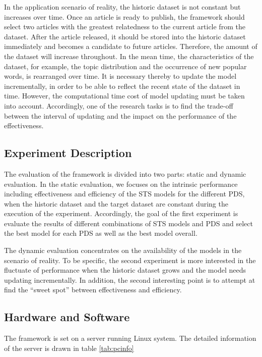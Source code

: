 In the application scenario of reality, the historic dataset is not constant but increases over time. Once an article is ready to publish, the framework should select two articles with the greatest relatedness to the current article from the dataset. After the article released, it should be stored into the historic dataset immediately and becomes a candidate to future articles. Therefore, the amount of the dataset will increase throughout. In the mean time, the characteristics of the dataset, for example, the topic distribution and the occurrence of new popular words, is rearranged over time. It is necessary thereby to update the model incrementally, in order to be able to reflect the recent state of the dataset in time. However, the computational time cost of model updating must be taken into account. Accordingly, one of the research tasks is to find the trade-off between the interval of updating and the impact on the performance of the effectiveness.  

\subsection{Experiment Description}
\label{sec:4.4}

The evaluation of the framework is divided into two parts: static and dynamic evaluation. In the static evaluation, we focuses on the intrinsic performance including effectiveness and efficiency of the STS models for the different PDS, when the historic dataset and the target dataset are constant during the execution of the experiment. Accordingly, the goal of the first experiment is evaluate the results of different combinations of STS models and PDS and select the best model for each PDS as well as the best model overall. 

The dynamic evaluation concentrates on the availability of the models in the scenario of reality. To be specific, the second experiment is more interested in the fluctuate of performance when the historic dataset grows and the model needs updating incrementally. In addition, the second interesting point is to attempt at find the ``sweet spot'' between effectiveness and efficiency.

\subsection{Hardware and Software}

The framework is set on a server running Linux system. The detailed information of the server is drawn in table \ref{tab:pcinfo}

